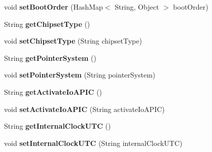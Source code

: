 \begin{DoxyCompactItemize}
\mbox{\label{classrwb_1_1java_1_1divers_1_1_hashmap_b_o_af9662f936532c4b6d0f16d527e4bfeb5}} 
void {\bfseries set\+Boot\+Order} (Hash\+Map$<$ String, Object $>$ boot\+Order)
\item 
\mbox{\label{classrwb_1_1java_1_1divers_1_1_hashmap_b_o_a0bae018b6588a2104472b201e713f264}} 
String {\bfseries get\+Chipset\+Type} ()
\item 
\mbox{\label{classrwb_1_1java_1_1divers_1_1_hashmap_b_o_afd1fcaeb4ae7e74365c3c4bbd01b1720}} 
void {\bfseries set\+Chipset\+Type} (String chipset\+Type)
\item 
\mbox{\label{classrwb_1_1java_1_1divers_1_1_hashmap_b_o_a945839b74032fb1ece3cddb6df31d59c}} 
String {\bfseries get\+Pointer\+System} ()
\item 
\mbox{\label{classrwb_1_1java_1_1divers_1_1_hashmap_b_o_afbcbe52b3ac0ee95b2bdcde08ce1d54a}} 
void {\bfseries set\+Pointer\+System} (String pointer\+System)
\item 
\mbox{\label{classrwb_1_1java_1_1divers_1_1_hashmap_b_o_a796f8bae41279b2934dec1cf6f6d8150}} 
String {\bfseries get\+Activate\+Io\+A\+P\+IC} ()
\item 
\mbox{\label{classrwb_1_1java_1_1divers_1_1_hashmap_b_o_ac32655cebcd8233354baf10fefcd0c9b}} 
void {\bfseries set\+Activate\+Io\+A\+P\+IC} (String activate\+Io\+A\+P\+IC)
\item 
\mbox{\label{classrwb_1_1java_1_1divers_1_1_hashmap_b_o_aea2e9075812b5289332c6582eccab7ab}} 
String {\bfseries get\+Internal\+Clock\+U\+TC} ()
\item 
\mbox{\label{classrwb_1_1java_1_1divers_1_1_hashmap_b_o_ac0b46986e8d3ad4e0c69346415f2b19a}} 
void {\bfseries set\+Internal\+Clock\+U\+TC} (String internal\+Clock\+U\+TC)
\item 

\end{DoxyCompactItemize}
